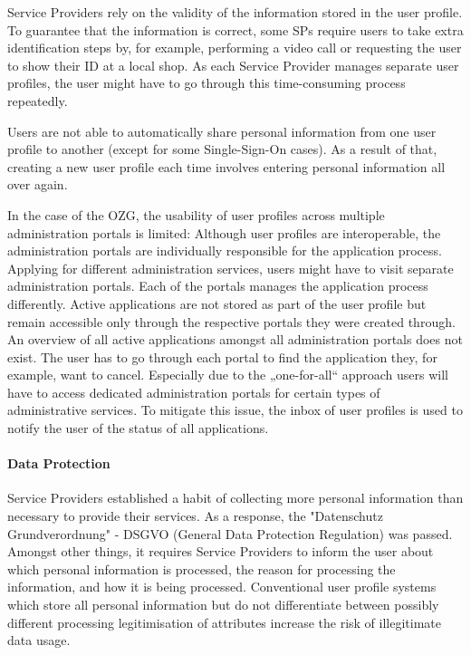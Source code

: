 Service Providers rely on the validity of the information stored in the user profile. To guarantee that the information is correct, some SPs require users to take extra identification steps by, for example, performing a video call or requesting the user to show their ID at a local shop. As each Service Provider manages separate user profiles, the user might have to go through this time-consuming process repeatedly.

Users are not able to automatically share personal information from one user profile to another (except for some Single-Sign-On cases). As a result of that, creating a new user profile each time involves entering personal information all over again. 


In the case of the OZG, the usability of user profiles across multiple administration portals is limited: Although user profiles are interoperable, the administration portals are individually responsible for the application process. Applying for different administration services, users might have to visit separate administration portals. Each of the portals manages the application process differently. Active applications are not stored as part of the user profile but remain accessible only through the respective portals they were created through.\\ An overview of all active applications amongst all administration portals does not exist. The user has to go through each portal to find the application they, for example, want to cancel. Especially due to the „one-for-all“ approach users will have to access dedicated administration portals for certain types of administrative services. To mitigate this issue, the inbox of user profiles is used to notify the user of the status of all applications.

\paragraph{Data Protection}
Service Providers established a habit of collecting more personal information than necessary to provide their services. As a response, the "Datenschutz Grundverordnung" - DSGVO (General Data Protection Regulation) was passed. Amongst other things, it requires Service Providers to inform the user about which personal information is processed, the reason for processing the information, and how it is being processed. Conventional user profile systems which store all personal information but do not differentiate between possibly different processing legitimisation of attributes increase the risk of illegitimate data usage.

